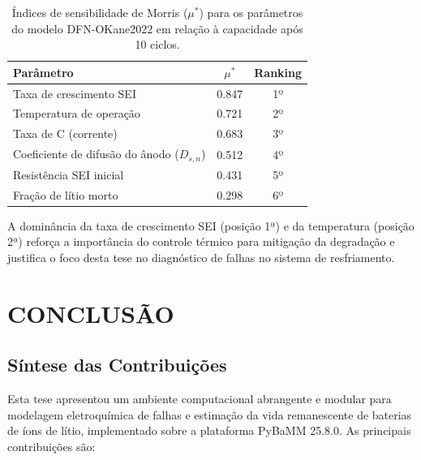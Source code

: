 \documentclass[
    12pt,
    openright,
    twoside,
    a4paper,
    brazil,
    english
]{abntex2}
\begin{document}
\begin{table}[htb]
  \centering
  \caption{Índices de sensibilidade de Morris ($\mu^*$) para os parâmetros
           do modelo DFN-OKane2022 em relação à capacidade após 10 ciclos.}
  \label{tab:sensibilidade}
  \begin{tabular}{lcc}
    \toprule
    \textbf{Parâmetro}                    & \textbf{$\mu^*$} & \textbf{Ranking} \\
    \midrule
    Taxa de crescimento SEI               & 0.847 & 1º \\
    Temperatura de operação               & 0.721 & 2º \\
    Taxa de C (corrente)                  & 0.683 & 3º \\
    Coeficiente de difusão do ânodo ($D_{s,n}$) & 0.512 & 4º \\
    Resistência SEI inicial               & 0.431 & 5º \\
    Fração de lítio morto                 & 0.298 & 6º \\
    \bottomrule
  \end{tabular}
\end{table}

A dominância da taxa de crescimento SEI (posição 1ª) e da temperatura (posição 2ª)
reforça a importância do controle térmico para mitigação da degradação e
justifica o foco desta tese no diagnóstico de falhas no sistema de resfriamento.

\chapter{CONCLUSÃO}
\label{cap:conclusao}

\section{Síntese das Contribuições}

Esta tese apresentou um ambiente computacional abrangente e modular para
modelagem eletroquímica de falhas e estimação da vida remanescente de baterias
de íons de lítio, implementado sobre a plataforma PyBaMM 25.8.0. As principais
contribuições são:
\end{document}
